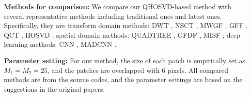 \documentclass[journal]{IEEEtran}
\begin{document}
\textbf{Methods for comparison:} We compare our QHOSVD-based method with several representative methods  including traditional ones and latest ones. Specifically, they are transform domain methods:
DWT \cite{DBLP:journals/cvgip/LiMM95}, NSCT \cite{2007Image},  MWGF \cite{DBLP:journals/inffus/ZhouLW14}, GFF \cite{DBLP:journals/tip/LiKH13}, QCT \cite{2012Multifocus},  HOSVD \cite{DBLP:journals/tip/LiangHLZ12}; spatial domain methods: QUADTREE \cite{DBLP:journals/inffus/BaiZZX15}, GFDF \cite{DBLP:journals/spic/QiuLZY19}, MISF \cite{DBLP:journals/jei/ZhanKLH19}; deep learning methods:
CNN \cite{DBLP:journals/inffus/LiuCPW17}, MADCNN \cite{DBLP:journals/access/LaiLGX19}.

\textbf{Parameter setting:}
For our method, the size of each patch is empirically set as $M_{1}=M_{2}=25$, and the patches are overlapped with $6$ pixels. All compared methods are from the source codes, and the parameter settings are based on the suggestions in the original papers.

\end{document}

